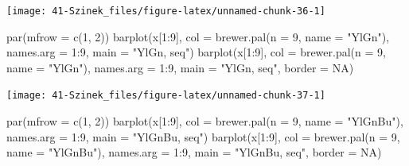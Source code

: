 \documentclass[
]{book}
\newenvironment{Shaded}{\begin{snugshade}}{\end{snugshade}}
\newcommand{\AttributeTok}[1]{\textcolor[rgb]{0.77,0.63,0.00}{#1}}
\newcommand{\ConstantTok}[1]{\textcolor[rgb]{0.00,0.00,0.00}{#1}}
\newcommand{\DecValTok}[1]{\textcolor[rgb]{0.00,0.00,0.81}{#1}}
\newcommand{\FunctionTok}[1]{\textcolor[rgb]{0.00,0.00,0.00}{#1}}
\newcommand{\NormalTok}[1]{#1}
\newcommand{\SpecialCharTok}[1]{\textcolor[rgb]{0.00,0.00,0.00}{#1}}
\newcommand{\StringTok}[1]{\textcolor[rgb]{0.31,0.60,0.02}{#1}}
\begin{document}
\begin{center}\texttt{[image: 41-Szinek\_files/figure-latex/unnamed-chunk-36-1]} \end{center}

\begin{Shaded}
\begin{Highlighting}[]
\FunctionTok{par}\NormalTok{(}\AttributeTok{mfrow =} \FunctionTok{c}\NormalTok{(}\DecValTok{1}\NormalTok{, }\DecValTok{2}\NormalTok{))}
\FunctionTok{barplot}\NormalTok{(x[}\DecValTok{1}\SpecialCharTok{:}\DecValTok{9}\NormalTok{], }\AttributeTok{col =} \FunctionTok{brewer.pal}\NormalTok{(}\AttributeTok{n =} \DecValTok{9}\NormalTok{, }\AttributeTok{name =} \StringTok{"YlGn"}\NormalTok{), }\AttributeTok{names.arg =} \DecValTok{1}\SpecialCharTok{:}\DecValTok{9}\NormalTok{, }\AttributeTok{main =} \StringTok{"YlGn, seq"}\NormalTok{)}
\FunctionTok{barplot}\NormalTok{(x[}\DecValTok{1}\SpecialCharTok{:}\DecValTok{9}\NormalTok{], }\AttributeTok{col =} \FunctionTok{brewer.pal}\NormalTok{(}\AttributeTok{n =} \DecValTok{9}\NormalTok{, }\AttributeTok{name =} \StringTok{"YlGn"}\NormalTok{), }\AttributeTok{names.arg =} \DecValTok{1}\SpecialCharTok{:}\DecValTok{9}\NormalTok{, }\AttributeTok{main =} \StringTok{"YlGn, seq"}\NormalTok{, }
    \AttributeTok{border =} \ConstantTok{NA}\NormalTok{)}
\end{Highlighting}
\end{Shaded}

\begin{center}\texttt{[image: 41-Szinek\_files/figure-latex/unnamed-chunk-37-1]} \end{center}

\begin{Shaded}
\begin{Highlighting}[]
\FunctionTok{par}\NormalTok{(}\AttributeTok{mfrow =} \FunctionTok{c}\NormalTok{(}\DecValTok{1}\NormalTok{, }\DecValTok{2}\NormalTok{))}
\FunctionTok{barplot}\NormalTok{(x[}\DecValTok{1}\SpecialCharTok{:}\DecValTok{9}\NormalTok{], }\AttributeTok{col =} \FunctionTok{brewer.pal}\NormalTok{(}\AttributeTok{n =} \DecValTok{9}\NormalTok{, }\AttributeTok{name =} \StringTok{"YlGnBu"}\NormalTok{), }\AttributeTok{names.arg =} \DecValTok{1}\SpecialCharTok{:}\DecValTok{9}\NormalTok{, }\AttributeTok{main =} \StringTok{"YlGnBu, seq"}\NormalTok{)}
\FunctionTok{barplot}\NormalTok{(x[}\DecValTok{1}\SpecialCharTok{:}\DecValTok{9}\NormalTok{], }\AttributeTok{col =} \FunctionTok{brewer.pal}\NormalTok{(}\AttributeTok{n =} \DecValTok{9}\NormalTok{, }\AttributeTok{name =} \StringTok{"YlGnBu"}\NormalTok{), }\AttributeTok{names.arg =} \DecValTok{1}\SpecialCharTok{:}\DecValTok{9}\NormalTok{, }\AttributeTok{main =} \StringTok{"YlGnBu, seq"}\NormalTok{, }
    \AttributeTok{border =} \ConstantTok{NA}\NormalTok{)}
\end{Highlighting}
\end{Shaded}
\end{document}
